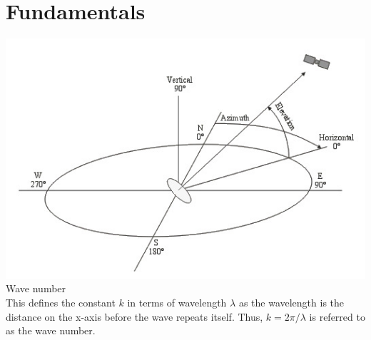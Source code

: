 \chapter{Fundamentals}
\label{chap:fundamentals}

\includegraphics[Elevation and azimuth angle]{images/Elevation_and_azimuth_angle.jpg}
\newpage
\LARGE
Wave number\\
\normalsize
This defines the constant $k$ in terms of wavelength $\lambda$ as the wavelength is the distance on the
x-axis before the wave repeats itself. Thus, $k = 2\pi/\lambda$ is referred to as the
wave number.\cite{Fuller1995}
